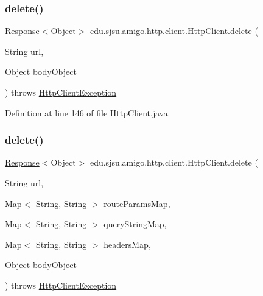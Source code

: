\subsubsection{\texorpdfstring{delete()}{delete()}\hspace{0.1cm}{\footnotesize\ttfamily [1/2]}}
{\footnotesize\ttfamily \hyperlink{classedu_1_1sjsu_1_1amigo_1_1http_1_1client_1_1_response}{Response}$<$Object$>$ edu.\+sjsu.\+amigo.\+http.\+client.\+Http\+Client.\+delete (\begin{DoxyParamCaption}\item[{String}]{url,  }\item[{Object}]{body\+Object }\end{DoxyParamCaption}) throws \hyperlink{classedu_1_1sjsu_1_1amigo_1_1http_1_1client_1_1_http_client_exception}{Http\+Client\+Exception}}



Definition at line 146 of file Http\+Client.\+java.

\mbox{\label{classedu_1_1sjsu_1_1amigo_1_1http_1_1client_1_1_http_client_a85083a4f63526cfbc0b4004b0ef4082e}} 
\subsubsection{\texorpdfstring{delete()}{delete()}\hspace{0.1cm}{\footnotesize\ttfamily [2/2]}}
{\footnotesize\ttfamily \hyperlink{classedu_1_1sjsu_1_1amigo_1_1http_1_1client_1_1_response}{Response}$<$Object$>$ edu.\+sjsu.\+amigo.\+http.\+client.\+Http\+Client.\+delete (\begin{DoxyParamCaption}\item[{String}]{url,  }\item[{Map$<$ String, String $>$}]{route\+Params\+Map,  }\item[{Map$<$ String, String $>$}]{query\+String\+Map,  }\item[{Map$<$ String, String $>$}]{headers\+Map,  }\item[{Object}]{body\+Object }\end{DoxyParamCaption}) throws \hyperlink{classedu_1_1sjsu_1_1amigo_1_1http_1_1client_1_1_http_client_exception}{Http\+Client\+Exception}}



